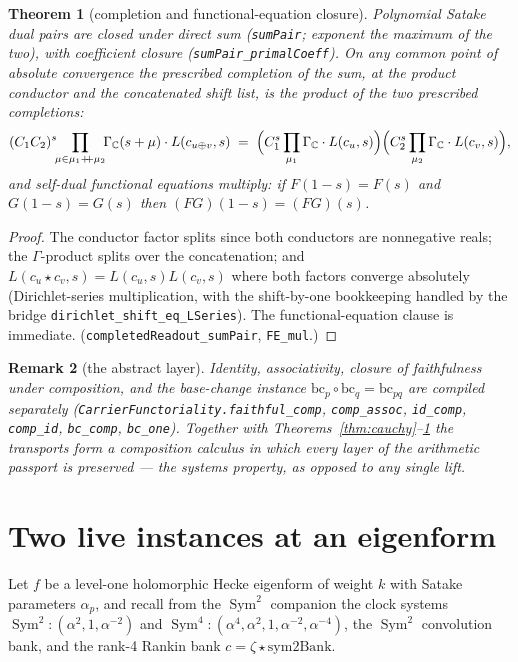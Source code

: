 \documentclass[11pt]{article}
\newtheorem{theorem}{Theorem}
\newtheorem{remark}[theorem]{Remark}
\newcommand{\Sym}{\operatorname{Sym}}
\newcommand{\Gm}{\Gamma_{\mathbb C}}
\begin{document}
\begin{theorem}[completion and functional-equation closure]\label{thm:completion}
Polynomial Satake dual pairs are closed under direct sum
(\textup{\texttt{sumPair}}; exponent the maximum of the two), with coefficient closure
\textup{(\texttt{sumPair\_primalCoeff})}.  On any common point of absolute convergence the
prescribed completion of the sum, at the product conductor and the concatenated shift list, is
the product of the two prescribed completions:
\[
  (C_1C_2)^s\!\!\prod_{\mu\in\mu_1\mathbin{+\!\!+}\mu_2}\!\!\Gm(s+\mu)\cdot L(c_{u\oplus v},s)
  \;=\;\Bigl(C_1^s\prod_{\mu_1}\Gm\cdot L(c_u,s)\Bigr)
        \Bigl(C_2^s\prod_{\mu_2}\Gm\cdot L(c_v,s)\Bigr),
\]
and self-dual functional equations multiply: if $F(1-s)=F(s)$ and $G(1-s)=G(s)$ then
$(FG)(1-s)=(FG)(s)$.
\end{theorem}
\begin{proof}
The conductor factor splits since both conductors are nonnegative reals; the $\Gamma$-product
splits over the concatenation; and $L(c_u\star c_v,s)=L(c_u,s)L(c_v,s)$ where both factors
converge absolutely (Dirichlet-series multiplication, with the shift-by-one bookkeeping
handled by the bridge \texttt{dirichlet\_shift\_eq\_LSeries}).  The functional-equation clause
is immediate.  (\texttt{completedReadout\_sumPair}, \texttt{FE\_mul}.)
\end{proof}

\begin{remark}[the abstract layer]
Identity, associativity, closure of faithfulness under composition, and the base-change
instance $\mathrm{bc}_p\circ\mathrm{bc}_q=\mathrm{bc}_{pq}$ are compiled separately
(\texttt{CarrierFunctoriality.faithful\_comp}, \texttt{comp\_assoc}, \texttt{id\_comp},
\texttt{comp\_id}, \texttt{bc\_comp}, \texttt{bc\_one}).  Together with
Theorems~\ref{thm:cauchy}--\ref{thm:completion} the transports form a composition calculus in
which every layer of the arithmetic passport is preserved --- the systems property, as opposed
to any single lift.
\end{remark}

\section{Two live instances at an eigenform}

Let $f$ be a level-one holomorphic Hecke eigenform of weight $k$ with Satake parameters
$\alpha_p$, and recall from the $\Sym^2$ companion the clock systems
$\Sym^2\!:(\alpha^2,1,\alpha^{-2})$ and $\Sym^4\!:(\alpha^4,\alpha^2,1,\alpha^{-2},\alpha^{-4})$,
the $\Sym^2$ convolution bank, and the rank-4 Rankin bank
$c=\zeta\star\mathrm{sym2Bank}$.
\end{document}

